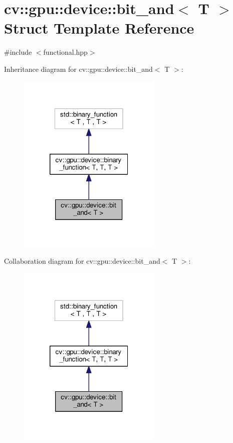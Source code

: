 \hypertarget{structcv_1_1gpu_1_1device_1_1bit__and}{\section{cv\-:\-:gpu\-:\-:device\-:\-:bit\-\_\-and$<$ T $>$ Struct Template Reference}
\label{structcv_1_1gpu_1_1device_1_1bit__and}
}


{\ttfamily \#include $<$functional.\-hpp$>$}



Inheritance diagram for cv\-:\-:gpu\-:\-:device\-:\-:bit\-\_\-and$<$ T $>$\-:\nopagebreak
\begin{figure}[H]
\begin{center}
\leavevmode
\includegraphics[width=194pt]{structcv_1_1gpu_1_1device_1_1bit__and__inherit__graph}
\end{center}
\end{figure}


Collaboration diagram for cv\-:\-:gpu\-:\-:device\-:\-:bit\-\_\-and$<$ T $>$\-:\nopagebreak
\begin{figure}[H]
\begin{center}
\leavevmode
\includegraphics[width=194pt]{structcv_1_1gpu_1_1device_1_1bit__and__coll__graph}
\end{center}
\end{figure}
